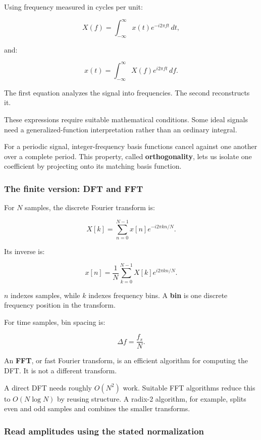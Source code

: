 Using frequency measured in cycles per unit:

\[
X(f)=\int_{-\infty}^{\infty}x(t)e^{-i2\pi ft}\,dt,
\]

and:

\[
x(t)=\int_{-\infty}^{\infty}X(f)e^{i2\pi ft}\,df.
\]

The first equation analyzes the signal into frequencies. The second reconstructs it.

These expressions require suitable mathematical conditions. Some ideal signals need a generalized-function interpretation rather than an ordinary integral.

For a periodic signal, integer-frequency basis functions cancel against one another over a complete period. This property, called \textbf{orthogonality}, lets us isolate one coefficient by projecting onto its matching basis function.

\subsubsection{The finite version: DFT and FFT}\label{04-visual-computing-ii-ch043-the-finite-version-dft-and-fft}

For \(N\) samples, the discrete Fourier transform is:

\[
X[k]=\sum_{n=0}^{N-1}x[n]e^{-i2\pi kn/N}.
\]

Its inverse is:

\[
x[n]=\frac1N\sum_{k=0}^{N-1}X[k]e^{i2\pi kn/N}.
\]

\(n\) indexes samples, while \(k\) indexes frequency bins. A \textbf{bin} is one discrete frequency position in the transform.

For time samples, bin spacing is:

\[
\Delta f=\frac{f_s}{N}.
\]

An \textbf{FFT}, or fast Fourier transform, is an efficient algorithm for computing the DFT. It is not a different transform.

A direct DFT needs roughly \(O(N^2)\) work. Suitable FFT algorithms reduce this to \(O(N\log N)\) by reusing structure. A radix-2 algorithm, for example, splits even and odd samples and combines the smaller transforms.

\subsubsection{Read amplitudes using the stated normalization}\label{04-visual-computing-ii-ch043-read-amplitudes-using-the-stated-normalization}

